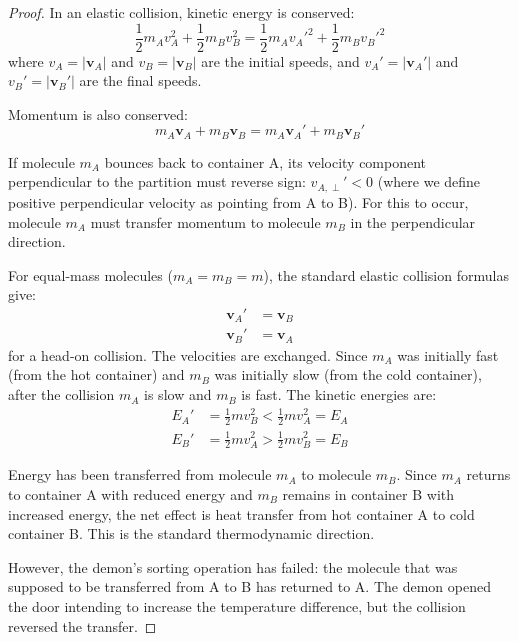 \documentclass[12pt,a4paper]{article}
\theoremstyle{definition}
\theoremstyle{remark}
\begin{document}
\begin{proof}
In an elastic collision, kinetic energy is conserved:
\begin{equation}
\frac{1}{2}m_A v_A^2 + \frac{1}{2}m_B v_B^2 = \frac{1}{2}m_A v_A'^2 + \frac{1}{2}m_B v_B'^2
\label{eq:elastic_energy}
\end{equation}
where $v_A = |\mathbf{v}_A|$ and $v_B = |\mathbf{v}_B|$ are the initial speeds, and $v_A' = |\mathbf{v}_A'|$ and $v_B' = |\mathbf{v}_B'|$ are the final speeds.

Momentum is also conserved:
\begin{equation}
m_A \mathbf{v}_A + m_B \mathbf{v}_B = m_A \mathbf{v}_A' + m_B \mathbf{v}_B'
\label{eq:elastic_momentum}
\end{equation}

If molecule $m_A$ bounces back to container A, its velocity component perpendicular to the partition must reverse sign: $v_{A,\perp}' < 0$ (where we define positive perpendicular velocity as pointing from A to B). For this to occur, molecule $m_A$ must transfer momentum to molecule $m_B$ in the perpendicular direction.

For equal-mass molecules ($m_A = m_B = m$), the standard elastic collision formulas give:
\begin{align}
\mathbf{v}_A' &= \mathbf{v}_B \label{eq:elastic_vA} \\
\mathbf{v}_B' &= \mathbf{v}_A \label{eq:elastic_vB}
\end{align}
for a head-on collision. The velocities are exchanged. Since $m_A$ was initially fast (from the hot container) and $m_B$ was initially slow (from the cold container), after the collision $m_A$ is slow and $m_B$ is fast. The kinetic energies are:
\begin{align}
E_A' &= \frac{1}{2}m v_B^2 < \frac{1}{2}m v_A^2 = E_A \\
E_B' &= \frac{1}{2}m v_A^2 > \frac{1}{2}m v_B^2 = E_B
\end{align}

Energy has been transferred from molecule $m_A$ to molecule $m_B$. Since $m_A$ returns to container A with reduced energy and $m_B$ remains in container B with increased energy, the net effect is heat transfer from hot container A to cold container B. This is the standard thermodynamic direction.

However, the demon's sorting operation has failed: the molecule that was supposed to be transferred from A to B has returned to A. The demon opened the door intending to increase the temperature difference, but the collision reversed the transfer.


\end{proof}
\end{document}
